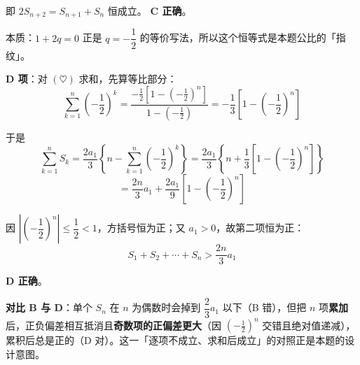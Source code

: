 \begin{answer}
即 $2S_{n+2}=S_{n+1}+S_n$ 恒成立。 \textbf{C 正确}。

\begin{gktip}
本质：$1+2q=0$ 正是 $q=-\dfrac12$ 的等价写法，所以这个恒等式是本题公比的「指纹」。
\end{gktip}

\par\medskip

\textbf{D 项}：对 $(\heartsuit)$ 求和，先算等比部分：
\nopagebreak[4]
\[\sum_{k=1}^{n}\left(-\frac12\right)^k=\frac{-\frac12\left[1-\left(-\frac12\right)^n\right]}{1-\left(-\frac12\right)}=-\frac13\left[1-\left(-\frac12\right)^n\right]\]

于是
\nopagebreak[4]
\[\sum_{k=1}^{n}S_k=\frac{2a_1}{3}\left\{n-\sum_{k=1}^{n}\left(-\frac12\right)^k\right\}=\frac{2a_1}{3}\left\{n+\frac13\left[1-\left(-\frac12\right)^n\right]\right\}\]
\nopagebreak[4]
\[=\frac{2n}{3}a_1+\frac{2a_1}{9}\left[1-\left(-\frac12\right)^n\right]\]

因 $\left|\left(-\dfrac12\right)^n\right|\le\dfrac12<1$，方括号恒为正；又 $a_1>0$，故第二项恒为正：
\nopagebreak[4]
\[S_1+S_2+\cdots+S_n>\frac{2n}{3}a_1\]

 \textbf{D 正确}。

\begin{gktip}
\textbf{对比 B 与 D}：单个 $S_n$ 在 $n$ 为偶数时会掉到 $\dfrac23a_1$ 以下（B 错），但把 $n$ 项\textbf{累加}后，正负偏差相互抵消且\textbf{奇数项的正偏差更大}（因 $\left(-\frac12\right)^n$ 交错且绝对值递减），累积后总是正的（D 对）。这一「逐项不成立、求和后成立」的对照正是本题的设计意图。
\end{gktip}


\par\medskip

\end{answer}
